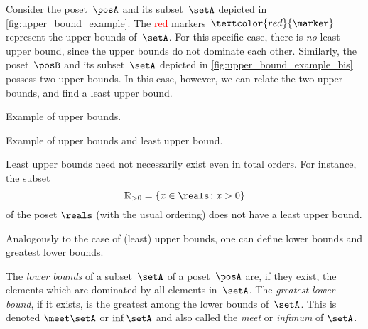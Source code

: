 \begin{example}
Consider the poset~$\posA$ and its subset~$\setA$ depicted in \cref{fig:upper_bound_example}.
The \textcolor{red}{red} markers~$\textcolor{red}{\marker}$ represent the upper bounds of~$\setA$.
For this specific case, there is \emph{no} least upper bound, since the upper bounds do not dominate each other.
Similarly, the poset~$\posB$ and its subset~$\setA$ depicted in \cref{fig:upper_bound_example_bis} possess two upper bounds.
In this case, however, we can relate the two upper bounds, and find a least upper bound.

    \begin{marginfigure}
        \begin{center}
        \end{center}
        \caption{Example of upper bounds. \label{fig:upper_bound_example}}
    \end{marginfigure}

    \begin{marginfigure}
        \begin{center}
        \end{center}
        \caption{Example of upper bounds and least upper bound. \label{fig:upper_bound_example_bis}}
    \end{marginfigure}
\end{example}


\begin{example}
    Least upper bounds need not necessarily exist even in total orders. For instance, the subset
    \begin{equation*}
        \mathbb{R}_{>0} = \{x\in \reals \colon x>0\}
    \end{equation*}
    of the poset $\reals$ (with the usual ordering) does not have a least upper bound.
\end{example}

Analogously to the case of (least) upper bounds, one can define lower bounds and greatest lower bounds.

\begin{definition}
    The \emph{lower bounds} of a subset~$\setA$ of a poset~$\posA$ are, if they exist, the elements which are dominated by all elements in~$\setA$.
    The \emph{greatest lower bound}, if it exists, is the greatest among the lower bounds of~$\setA$. This is denoted $\meet \setA$ or $\inf \setA$ and also called the \emph{meet} or \emph{infimum} of $\setA$.
\end{definition}

